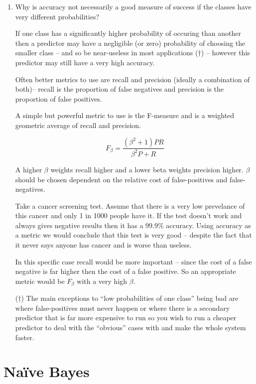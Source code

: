 \documentclass[10pt,\jkfside,a4paper]{article}
\begin{document}
\begin{enumerate}
\item Why is accuracy not necessarily a good measure of success if the classes
have very different probabilities?

If one class has a significantly higher probability of occuring than another then 
a predictor may have a negligible (or zero) probability of choosing the smaller 
class -- and so be near-useless in most applications ($\dagger$) -- however this 
predictor may still have a very high accuracy.

Often better metrics to use are recall and precision (ideally a combination of both)-- 
recall is the proportion of false negatives and precision is the proportion of false positives.

A simple but powerful metric to use is the F-measure and is a weighted geometric average of 
recall and precision.

\begin{equation}
F_\beta = \frac{(\beta^2 + 1)PR}{\beta^2P + R}
\end{equation}

A higher $\beta$ weights recall higher and a lower beta weights precision higher. $\beta$ should 
be chosen dependent on the relative cost of false-positives and false-negatives.

Take a cancer screening test. Assume that there is a very low prevelance of this cancer 
and only 1 in 1000 people have it.
If the test doesn't work and always gives negative results then it has a 99.9\% accuracy.
Using accuracy as a metric we would conclude that this test is very good -- despite 
the fact that it never says anyone has cancer and is worse than useless.

In this specific case recall would be more important -- since the 
cost of a false negative is far higher then the cost of a false positive.
So an appropriate metric would be $F_\beta$ with a very high $\beta$.

($\dagger$) The main exceptions to ``low probabilities of one class'' being bad are where 
false-positives must never happen or where there is a secondary predictor 
that is far more expensive to run so you wish to run a cheaper predictor to deal with the 
``obvious'' cases with and make the whole system faster.

\end{enumerate}

\section{Na\"ive Bayes}
\end{document}
